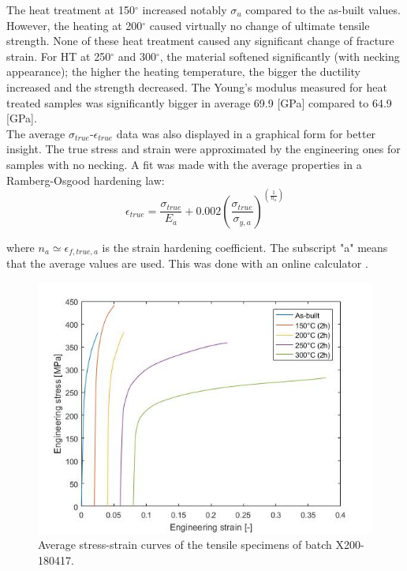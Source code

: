 The heat treatment at 150$^\circ$ increased notably $\sigma_u$ compared to the as-built values. However, the heating at 200$^\circ$ caused virtually no change of ultimate tensile strength. None of these heat treatment caused any significant change of fracture strain. For HT at 250$^\circ$ and 300$^\circ$, the material softened significantly (with necking appearance); the higher the heating temperature, the bigger the ductility increased and the strength decreased. The Young's modulus measured for heat treated samples was significantly bigger in average 69.9 [GPa] compared to 64.9 [GPa].\\

The average $\sigma_{true}$-$\epsilon_{true}$ data was also displayed in a graphical form for better insight. The true stress and strain were approximated by the engineering ones for samples with no necking. %
A fit was made with the average properties in a Ramberg-Osgood hardening law:\\

$$\epsilon_{true}=\frac{\sigma_{true}}{E_a}+ 0.002(\frac{\sigma_{true}}{\sigma_{y,a}})^{(\frac{1}{n_a})}$$

where $n_a \simeq \epsilon_{f,true,a}$ is the strain hardening coefficient. The subscript "a" means that the average values are used. This was done with an online calculator \parencite{RO}. \\


\begin{figure}[ht]
\centering
\centerline{\includegraphics[scale=0.7]{Images/MeanTrac}}
\decoRule
\caption[Average stress-strain curves of the tensile specimens of batch X200-180417.]{Average stress-strain curves of the tensile specimens of batch X200-180417.}
\label{fig:MeanTrac}
\end{figure}

